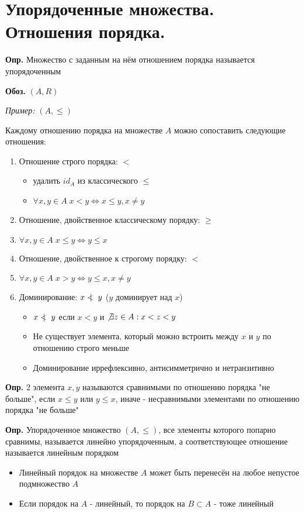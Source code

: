 \documentclass[10pt]{article}
\begin{document}
\section*{Упорядоченные множества. Отношения порядка.}
\par\textbf{Опр.} Множество с заданным на нём отношением порядка называется упорядоченным
\par\textbf{Обоз.} $(A, R)$
\par\textit{Пример:} $(A, \leq)$
\par Каждому отношению порядка на множестве $A$ можно сопоставить следующие отношения:
\begin{enumerate}
    \item Отношение строго порядка: $<$
        \begin{itemize}
            \item удалить $id_A$ из классического $\le$
            \item $\forall x, y \in A \; x < y \Leftrightarrow x \le y, x \not = y$
        \end{itemize}
    \item Отношение, двойственное классическому порядку: $\ge$
    \item[] $\forall x, y \in A \; x \le y \Leftrightarrow y \le x$
    \item Отношение, двойственное к строгому порядку: $<$
    \item[] $\forall x, y \in A \; x > y \Leftrightarrow y \le x, x \not = y$
    \item Доминирование: $x \mathrel{<\mkern-8mu\mid\mkern8mu} y$ ($y$ доминирует над $x$)
        \begin{itemize}
            \item $x \mathrel{<\mkern-8mu\mid\mkern8mu} y$ если $x < y$ и $\not \exists z \in A: x < z < y$
            \item Не существует элемента, который можно встроить между $x$ и $y$  по отношению строго меньше
            \item Доминирование иррефлексивно, антисимметрично и нетранзитивно
        \end{itemize}
\end{enumerate}

\par\textbf{Опр.} 2 элемента $x, y$ называются сравнимыми по отношению порядка "не больше", если $x \leq y$ или $y \leq x$, иначе - несравнимыми элементами по отношению порядка "не больше"
\par\textbf{Опр.} Упорядоченное множество $(A, \leq)$, все элементы которого попарно сравнимы, называется линейно упорядоченным, а соответствующее отношение называется линейным порядком
\begin{itemize}
    \item Линейный порядок на множестве $A$ может быть перенесён на любое непустое подмножество $A$
    \item Если порядок на $A$ - линейный, то порядок на $B \subset A$ - тоже линейный
\end{itemize}
\end{document}
